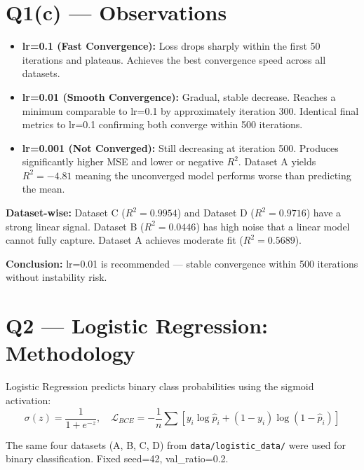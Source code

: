 \documentclass{article}
\begin{document}
\newpage
\section{Q1(c) --- Observations}

\begin{itemize}
    \item \textbf{lr=0.1 (Fast Convergence):} Loss drops sharply within the first 50 iterations and plateaus. Achieves the best convergence speed across all datasets.

    \item \textbf{lr=0.01 (Smooth Convergence):} Gradual, stable decrease. Reaches a minimum comparable to lr=0.1 by approximately iteration 300. Identical final metrics to lr=0.1 confirming both converge within 500 iterations.

    \item \textbf{lr=0.001 (Not Converged):} Still decreasing at iteration 500. Produces significantly higher MSE and lower or negative $R^2$. Dataset A yields $R^2 = -4.81$ meaning the unconverged model performs worse than predicting the mean.
\end{itemize}

\textbf{Dataset-wise:} Dataset C ($R^2=0.9954$) and Dataset D ($R^2=0.9716$) have a strong linear signal. Dataset B ($R^2=0.0446$) has high noise that a linear model cannot fully capture. Dataset A achieves moderate fit ($R^2=0.5689$).

\textbf{Conclusion:} lr=0.01 is recommended --- stable convergence within 500 iterations without instability risk.

\newpage
\section{Q2 --- Logistic Regression: Methodology}

Logistic Regression predicts binary class probabilities using the sigmoid activation:
\[ \sigma(z) = \frac{1}{1+e^{-z}}, \quad \mathcal{L}_{BCE} = -\frac{1}{n}\sum\left[y_i\log\hat{p}_i + (1-y_i)\log(1-\hat{p}_i)\right] \]

The same four datasets (A, B, C, D) from \texttt{data/logistic\_data/} were used for binary classification. Fixed seed=42, val\_ratio=0.2.
\end{document}
